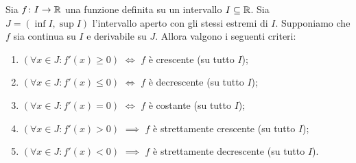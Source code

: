 \begin{theorem}%
\label{th:criteri_monotonia}
\mymark{***}%
%
%
Sia $f\colon I \to \mathbb R$ una funzione definita su un intervallo $I\subseteq \mathbb R$. Sia $J= (\inf I, \sup I)$ l'intervallo aperto con gli stessi estremi di $I$.
Supponiamo che $f$ sia continua su $I$ e derivabile su $J$. Allora valgono i seguenti criteri:
\begin{enumerate}
\item
$(\forall x \in J\colon f'(x)\ge 0)$
$\iff$
$f$ è crescente (su tutto $I$);
\item
$(\forall x \in J\colon f'(x)\le 0)$
$\iff$
$f$ è decrescente (su tutto $I$);
\item
$(\forall x \in J\colon f'(x)=0)$
$\iff$
$f$ è costante (su tutto $I$);
\item
$(\forall x \in J\colon f'(x)>0)$
$\implies$
$f$ è strettamente crescente (su tutto $I$);
\item
$(\forall x \in J\colon f'(x)<0)$
$\implies$
$f$ è strettamente decrescente (su tutto $I$).
\end{enumerate}
\end{theorem}
%
